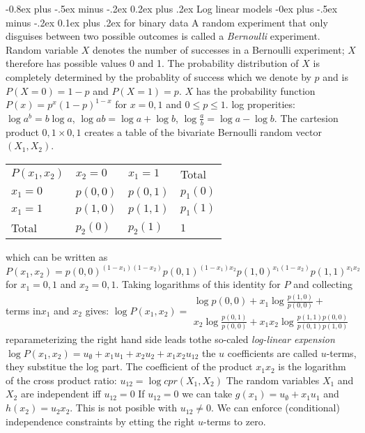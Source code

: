 \documentclass[9pt,landscape]{extarticle}
\makeatletter
\renewcommand{\subsection}{\@startsection{subsection}{2}{0mm}%
                                {-0.8ex plus -.5ex minus -.2ex}%
                                {0.2ex plus .2ex}%
                                {\normalfont\normalsize\bfseries}}
\renewcommand{\subsubsection}{\@startsection{subsubsection}{3}{0mm}%
                                {-0ex plus -.5ex minus -.2ex}%
                                {0.1ex plus .2ex}%
                                {\normalfont\small\bfseries}}
\makeatother
\begin{document}
\begin{multicols}{3}
\subsection{Log linear models}
\subsubsection{for binary data}
A random experiment that only disguises between two possible outcomes is
called a \emph{Bernoulli} experiment. Random variable $X$ denotes the number of
successes in a Bernoulli experiment; $X$ therefore has possible values 0 and 1.
The probability distribution of $X$ is completely determined by the probablity of
success which we denote by $p$  and is $P(X=0) = 1 - p $ and $ P(X=1)=p$.
$X$ has the probability function $P(x)=p^x(1-p)^{1-x}$ for $x=0,1$ and
$0 \leq p \leq 1$.
log properities: $\log a^b=b \log a$, $\log ab = \log a + \log b$,
$\log \frac{a}{b}=\log a - \log b$.
The cartesion product 
${0,1} \times {0,1}$ creates a table of the bivariate Bernoulli random
vector $(X_1,X_2)$.
\begin{tabular}{llll}
  $P(x_1,x_2)$ & $x_2=0$ & $x_1=1$ & Total \\
  $x_1=0$ & $p(0,0)$ & $p(0,1)$ & $p_1(0)$ \\
  $x_1=1$ & $p(1,0)$ & $p(1,1)$ & $p_1(1)$ \\
  Total & $p_2(0)$ & $p_2(1)$ & $1$ \\
\end{tabular}
which can be written as
$P(x_1,x_2)=p(0,0)^{(1-x_1)(1-x_2)}p(0,1)^{(1-x_1)x_2}p(1,0)^{x_1(1-x_2)}p(1,1)^{x_1x_2}$
for $x_1=0,1$ and $x_2=0,1$.
Taking logarithms of this identity for $P$ and collecting terms in$x_1$ and
$x_2$ gives:
$\log P(x_1,x_2)= \begin{matrix}
    \log p(0,0) + x_1 \log \frac{p(1,0)}{p(0,0)} +  \\
    x_2 \log \frac{p(0,1)}{p(0,0)} + x_1 x_2 \log \frac{p(1,1)p(0,0)}{p(0,1)p(1,0)}
    \end{matrix}
$
reparameterizing the right hand side leads tothe so-caled \emph{log-linear expension}
$\log P(x_1,x_2)=u_\emptyset+ x_1u_1 + x_2 u_2 + x_1 x_2 u_{12}$
the $u$ coefficients are called $u$-terms, they substitue the log part.
The coefficient of the product $x_1x_2$ is the logarithm of the cross product
ratio:
$u_{12}=\log cpr(X_1,X_2)$
The random variables $X_1$ and $X_2$ are independent iff $u_{12}=0$
If $u_{12}=0$ we can take $g(x_1)=u_\emptyset + x_1 u_1$ and $h(x_2)= u_2 x_2$.
This is not posible with $u_{12}\neq 0$.
We can enforce (conditional) independence constraints by etting the right
$u$-terms to zero.

\end{multicols}
\end{document}

